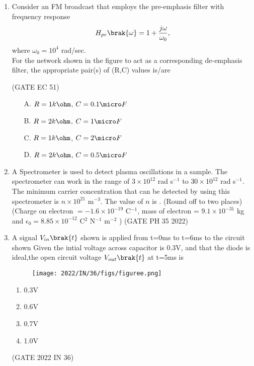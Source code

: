 \begin{enumerate}[label=\thechapter.\arabic*,ref=\thechapter.\theenumi]
\item Consider an FM broadcast that employs the pre-emphasis filter with frequency response \\
    \begin{align*}
        H_{pe}\brak{\omega}= 1+ \frac{j\omega}{\omega _0},
    \end{align*}
    where $\omega_0=10^4$ rad/sec. \\
    For the network shown in the figure to act as a corresponding de-emphasis filter, the
appropriate pair(s) of (R,C) values is/are 
\underline{\hspace{1in}}
\begin{figure}[htb]
  \centering
  
\end{figure}
\hfill(GATE EC 51)\\
\begin{enumerate}
    \item[A.] $R=1k\ohm$, $C=0.1\micro F$
    \item[B.] $R=2k\ohm$, $C=1\micro F$
    \item[C.] $R=1k\ohm$, $C=2\micro F$
    \item[D.] $R=2k\ohm$, $C=0.5\micro F$
\end{enumerate}
\solution

\pagebreak

\item A Spectrometer is used to detect plasma oscillations in a sample. The spectrometer 
can work in the range of $3 \times 10^{12}$ rad s$^{-1}$ to $30 \times 10^{12}$ rad s$^{-1}$. The minimum carrier concentration that can be detected by using this spectrometer is $n \times 10^{21}$ m$^{-3}$. The value of $n$ is \underline{\hspace{2cm}}. (Round off to two places)
(Charge on electron $= -1.6 \times 10^{-19} $ C$^{-1}$, mass of electron = $9.1 \times 10^{-31}$ kg and $\epsilon_0 = 8.85 \times 10^{-12}$ C$^{2}$ N$^{-1}$ m$^{-2}$ ) \hfill(GATE PH 35 2022)\\
\solution

\pagebreak
\item A signal $V_{in}\brak{t}$ shown is applied from t=0ms to t=6ms to the circuit shown Given the intial voltage across capacitor is 0.3V, and that the diode is ideal,the open circuit voltage $V_{out}\brak{t}$ at t=5ms is 
\begin{figure}[h] 
    \centering 
    \texttt{[image: 2022/IN/36/figs/figuree.png]} 
    \caption{ } 
\end{figure} 
\begin{enumerate} 
    \item 0.3V 
    \item0.6V 
    \item0.7V 
    \item1.0V 
\end{enumerate} 
\hfill(GATE 2022 IN 36)\\
\solution

\pagebreak


\end{enumerate}
